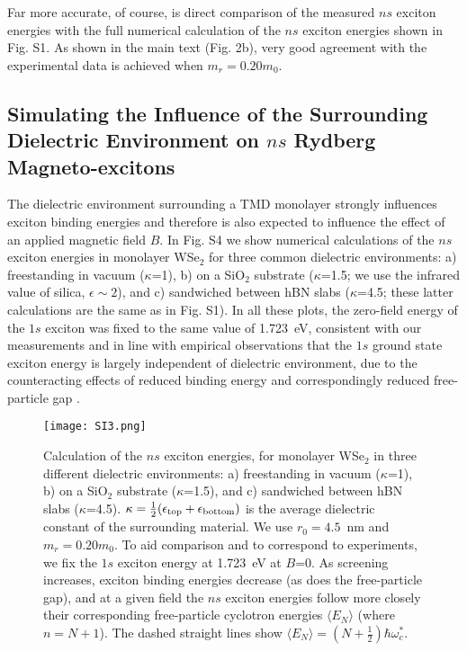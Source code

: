 \documentclass[aps,prl,twocolumn]{revtex4-1}
\begin{document}
Far more accurate, of course, is direct comparison of the measured $ns$ exciton energies with the full numerical calculation of the $ns$ exciton energies shown in Fig. S1.  As shown in the main text (Fig. 2b), very good agreement with the experimental data is achieved when $m_r = 0.20 m_0$.  

\subsection{Simulating the Influence of the Surrounding Dielectric Environment on $ns$ Rydberg Magneto-excitons}
%
The dielectric environment surrounding a TMD monolayer strongly influences exciton binding energies \cite{Stier_Nano} and therefore is also expected to influence the effect of an applied magnetic field $B$.  In Fig. S4 we show numerical calculations of the $ns$ exciton energies in monolayer WSe$_2$ for three common dielectric environments: a) freestanding in vacuum ($\kappa$=1), b) on a SiO$_2$ substrate ($\kappa$=1.5; we use the infrared value of silica, $\epsilon \sim 2$), and c) sandwiched between hBN slabs ($\kappa$=4.5; these latter calculations are the same as in Fig. S1). In all these plots, the zero-field energy of the $1s$ exciton was fixed to the same value of 1.723~eV, consistent with our measurements and in line with empirical observations that the $1s$ ground state exciton energy is largely independent of dielectric environment, due to the counteracting effects of reduced binding energy and correspondingly reduced free-particle gap \cite{Stier_Nano}.   
%
\begin{figure}[h]
\center
\texttt{[image: SI3.png]}
\caption{Calculation of the $ns$ exciton energies, for monolayer WSe$_2$ in three different dielectric environments: a) freestanding in vacuum ($\kappa$=1), b) on a SiO$_2$ substrate ($\kappa$=1.5), and c) sandwiched between hBN slabs ($\kappa$=4.5). $\kappa=\frac{1}{2}(\epsilon_{\rm top}+\epsilon_{\rm bottom})$ is the average dielectric constant of the surrounding material.  We use $r_0 = 4.5$~nm and $m_r = 0.20 m_0$. To aid comparison and to correspond to experiments, we fix the $1s$ exciton energy at 1.723~eV at $B$=0.  As screening increases, exciton binding energies decrease (as does the free-particle gap), and at a given field the $ns$ exciton energies follow more closely their corresponding free-particle cyclotron energies $\langle E_N \rangle$ (where $n=N+1$). The dashed straight lines show $\langle E_N \rangle = (N+\frac{1}{2})\hbar \omega_c^*$.} \label{fig2}
\end{figure} 
\end{document}
